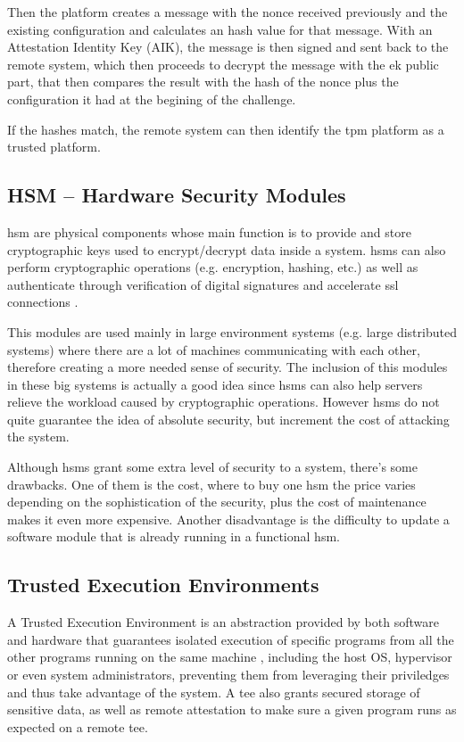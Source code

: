 Then the platform creates a message with the nonce received previously and the existing configuration and calculates an hash value for that message. With an Attestation Identity Key (AIK), the message is then signed and sent back to the remote system, which then proceeds to decrypt the message with the \gls{ek} public part, that then compares the result with the hash of the nonce plus the configuration it had at the begining of the challenge. 

If the hashes match, the remote system can then identify the \gls{tpm} platform as a trusted platform.

\subsection{HSM – Hardware Security Modules}
\label{ssec:hsm}

\gls{hsm} \cite{hsmPaper} are physical components whose main function is to provide and store cryptographic keys used to encrypt/decrypt data inside a system. \gls{hsm}s can also perform cryptographic operations (e.g. encryption, hashing, etc.) as well as authenticate through verification of digital signatures and accelerate \gls{ssl} connections \cite{hsmThesis}.

This modules are used mainly in large environment systems (e.g. large distributed systems) where there are a lot of machines communicating with each other, therefore creating a more needed sense of security. The inclusion of this modules in these big systems is actually a good idea since \gls{hsm}s can also help servers relieve the workload caused by cryptographic operations. However \gls{hsm}s do not quite guarantee the idea of absolute security, but increment the cost of attacking the system.

Although \gls{hsm}s grant some extra level of security to a system, there's some drawbacks. One of them is the cost, where to buy one \gls{hsm} the price varies depending on the sophistication of the security, plus the cost of maintenance makes it even more expensive. Another disadvantage is the difficulty to update a software module that is already running in a functional \gls{hsm}.

\subsection{Trusted Execution Environments}
\label{ssec:tee}

A Trusted Execution Environment is an abstraction provided by both software and hardware that guarantees isolated execution of specific programs from all the other programs running on the same machine \cite{guiBorgesThesis}, including the host OS, hypervisor or even system administrators, preventing them from leveraging their priviledges and thus take advantage of the system. A \gls{tee} also grants secured storage of sensitive data, as well as remote attestation to make sure a given program runs as expected on a remote \gls{tee}. 

